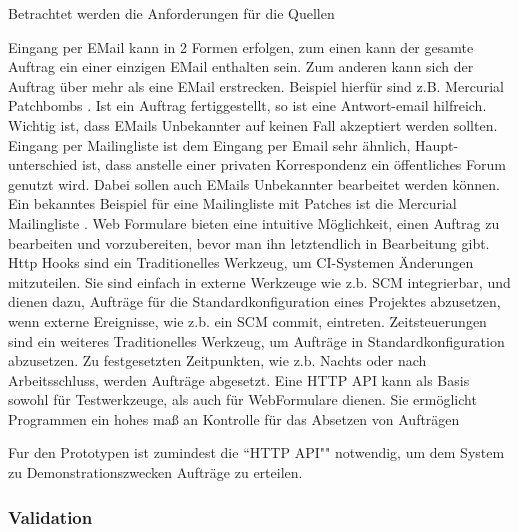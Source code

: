 Betrachtet werden die Anforderungen für die Quellen
\begin{description}
    \dhitem[EMail]
        Eingang per EMail kann in 2 Formen erfolgen,
        zum einen kann der gesamte Auftrag ein einer einzigen EMail enthalten sein.
        Zum anderen kann sich der Auftrag über mehr als eine EMail erstrecken.
        Beispiel hierfür sind z.B. Mercurial Patchbombs \cite{mercurial:patchbomb}.
        Ist ein Auftrag fertiggestellt, so ist eine Antwort-email hilfreich.
        Wichtig ist, dass EMails Unbekannter auf keinen Fall
        akzeptiert werden sollten.
    \dhitem[Mailingliste]
        Eingang per Mailingliste ist dem Eingang per Email sehr ähnlich,
        Haupt-unterschied ist, dass anstelle einer privaten Korrespondenz
        ein öffentliches Forum genutzt wird. Dabei sollen auch EMails Unbekannter 
        bearbeitet werden können.
        Ein bekanntes Beispiel für eine Mailingliste mit Patches
        ist die Mercurial Mailingliste \cite{mercurial:mailingliste}.
        Web Formulare bieten eine intuitive Möglichkeit,
        einen Auftrag zu bearbeiten und vorzubereiten,
        bevor man ihn letztendlich in Bearbeitung gibt.
        Http Hooks sind ein Traditionelles Werkzeug,
        um CI-Systemen Änderungen mitzuteilen.
        Sie sind einfach in externe Werkzeuge wie z.b. SCM integrierbar,
        und dienen dazu, Aufträge für die Standardkonfiguration
        eines Projektes abzusetzen, wenn externe Ereignisse,
        wie z.b. ein SCM commit, eintreten.
    \dhitem[Zeitsteuerung]
        Zeitsteuerungen sind ein weiteres Traditionelles Werkzeug,
        um Aufträge in Standardkonfiguration abzusetzen.
        Zu festgesetzten Zeitpunkten, wie z.b. Nachts oder nach
        Arbeitsschluss, werden Aufträge abgesetzt.
        Eine HTTP API kann als Basis sowohl für Testwerkzeuge,
        als auch für WebFormulare dienen.
        Sie ermöglicht Programmen ein hohes maß an Kontrolle
        für das Absetzen von Aufträgen
\end{description}

Fur den Prototypen ist zumindest die ``HTTP API"" notwendig,
um dem System zu Demonstrationszwecken Aufträge zu erteilen.


\subsubsection{Validation}


